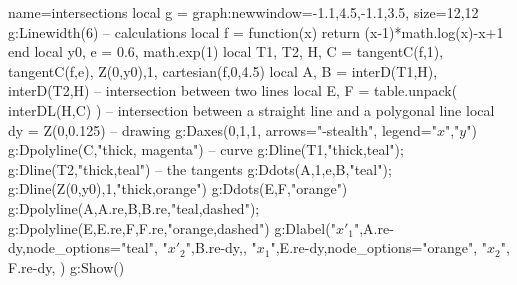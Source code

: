 \documentclass{standalone}%
\begin{document}
\begin{luadraw}{name=intersections}
local g = graph:new{window={-1.1,4.5,-1.1,3.5}, size={12,12}}
g:Linewidth(6)
-- calculations
local f = function(x) return (x-1)*math.log(x)-x+1 end
local y0, e = 0.6, math.exp(1)
local T1, T2, H, C = tangentC(f,1), tangentC(f,e), {Z(0,y0),1}, cartesian(f,0,4.5)
local A, B = interD(T1,H), interD(T2,H) -- intersection between two lines
local E, F = table.unpack( interDL(H,C) ) -- intersection between a straight line and a polygonal line
local dy = Z(0,0.125)
-- drawing
g:Daxes({0,1,1}, {arrows="-stealth", legend={"$x$","$y$"}})
g:Dpolyline(C,"thick, magenta") -- curve
g:Dline(T1,"thick,teal"); g:Dline(T2,"thick,teal") -- the tangents
g:Ddots({A,1,e,B},"teal"); g:Dline({Z(0,y0),1},"thick,orange")
g:Ddots({E,F},"orange")
g:Dpolyline({{A,A.re},{B,B.re}},"teal,dashed"); g:Dpolyline({{E,E.re},{F,F.re}},"orange,dashed")
g:Dlabel("${x'}_1$",A.re-dy,{node_options="teal"}, "${x'}_2$",B.re-dy,{}, 
    "$x_1$",E.re-dy,{node_options="orange"}, "$x_2$", F.re-dy, {})
g:Show()
\end{luadraw}
\end{document}
